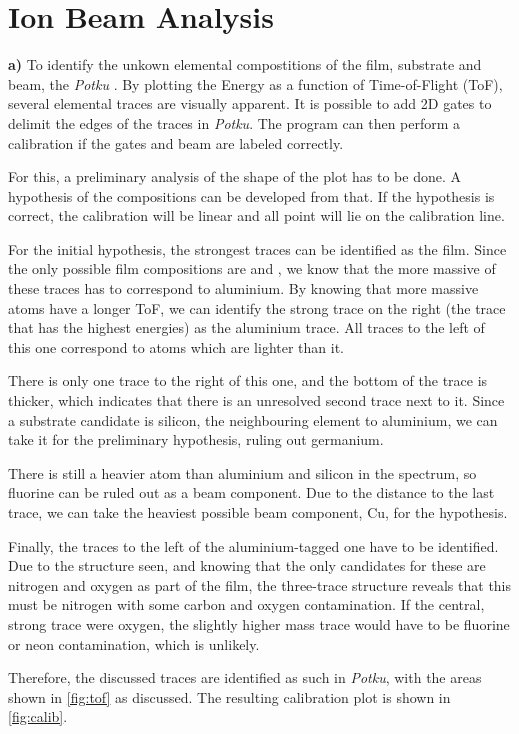 \section{Ion Beam Analysis}
\textbf{a)} To identify the unkown elemental compostitions of the film, substrate and beam, the \textit{Potku} \cite{potku}. By plotting the Energy as a function of Time-of-Flight (ToF), several elemental traces are visually apparent. It is possible to add 2D gates to delimit the edges of the traces in \textit{Potku}. The program can then perform a calibration if the gates and beam are labeled correctly. 

For this, a preliminary analysis of the shape of the plot has to be done. A hypothesis of the compositions can be developed from that. If the hypothesis is correct, the calibration will be linear and all point will lie on the calibration line. 

For the initial hypothesis, the strongest traces can be identified as the film. Since the only possible film compositions are  and , we know that the more massive of these traces has to correspond to aluminium. By knowing that more massive atoms have a longer ToF, we can identify the strong trace on the right (the trace that has the highest energies) as the aluminium trace. All traces to the left of this one correspond to atoms which are lighter than it. 

There is only one trace to the right of this one, and the bottom of the trace is thicker, which indicates that there is an unresolved second trace next to it. Since a substrate candidate is silicon, the neighbouring element to aluminium, we can take it for the preliminary hypothesis, ruling out germanium. 

There is still a heavier atom than aluminium and silicon in the spectrum, so fluorine can be ruled out as a beam component. Due to the distance to the last trace, we can take the heaviest possible beam component, Cu, for the hypothesis.

Finally, the traces to the left of the aluminium-tagged one have to be identified. Due to the structure seen, and knowing that the only candidates for these are nitrogen and oxygen as part of the film, the three-trace structure reveals that this must be nitrogen with some carbon and oxygen contamination. If the central, strong trace were oxygen, the slightly higher mass trace would have to be fluorine or neon contamination, which is unlikely.

Therefore, the discussed traces are identified as such in \textit{Potku}, with the areas shown in \autoref{fig:tof} as discussed. The resulting calibration plot is shown in \autoref{fig:calib}.

